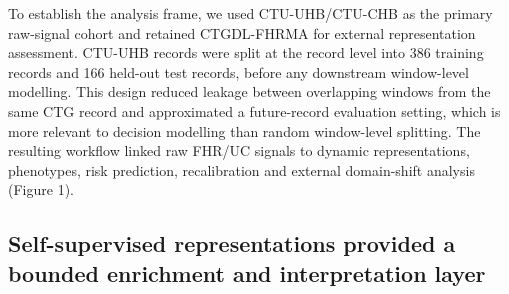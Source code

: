 \documentclass[utf8]{FrontiersinHarvard}
\begin{document}
To establish the analysis frame, we used CTU-UHB/CTU-CHB as the primary raw-signal cohort and retained CTGDL-FHRMA for external representation assessment. CTU-UHB records were split at the record level into 386 training records and 166 held-out test records, before any downstream window-level modelling. This design reduced leakage between overlapping windows from the same CTG record and approximated a future-record evaluation setting, which is more relevant to decision modelling than random window-level splitting. The resulting workflow linked raw FHR/UC signals to dynamic representations, phenotypes, risk prediction, recalibration and external domain-shift analysis (Figure 1).


\subsection{Self-supervised representations provided a bounded enrichment and interpretation layer}
\end{document}

